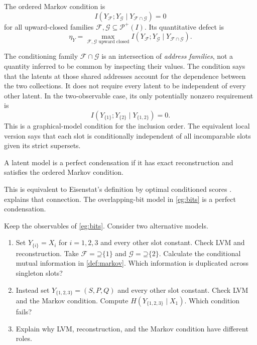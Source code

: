 \documentclass[11pt]{article}
\newcommand{\PI}{\mathcal{P}^{+}(I)}
\newcommand{\Up}{\mathord{\supseteq}}
\begin{document}
\begin{definition}
\label{def:markov}
The ordered Markov condition is
\[
 I(Y_{\mathcal{F}};Y_{\mathcal{G}}\mid
 Y_{\mathcal{F}\cap\mathcal{G}})=0
\]
for all upward-closed families $\mathcal{F},\mathcal{G}\subseteq\PI$.
Its quantitative defect is
\[
 \eta_Y=\max_{\mathcal{F},\mathcal{G}\text{ upward closed}}
 I(Y_{\mathcal{F}};Y_{\mathcal{G}}\mid Y_{\mathcal{F}\cap\mathcal{G}}).
\]
\end{definition}

The conditioning family $\mathcal{F}\cap\mathcal{G}$ is an intersection of
\emph{address families}, not a quantity inferred to be common by inspecting
their values. The condition says that the latents at those shared addresses
account for the dependence between the two collections. It does not require
every latent to be independent of every other latent. In the two-observable
case, its only potentially nonzero requirement is
\[
 I(Y_{\{1\}};Y_{\{2\}}\mid Y_{\{1,2\}})=0.
\]
This is a graphical-model condition for the inclusion order. The equivalent
local version says that each slot is conditionally independent of all
incomparable slots given its strict supersets.

\begin{definition}
\label{def:perfect}
A latent model is a perfect condensation if it has exact reconstruction
and satisfies the ordered Markov condition.
\end{definition}
This is equivalent to Eisenstat's definition by optimal conditioned scores
\citep[Theorem~5.10]{eisenstat2025condensation}.  explains that connection.
The overlapping-bit model in \cref{eg:bits} is a perfect condensation.

\begin{exercise}
\label{ex:failed}\important
Keep the observables of \cref{eg:bits}. Consider two alternative models.
\begin{enumerate}
\item Set $Y_{\{i\}}=X_i$ for $i=1,2,3$ and every other slot constant.
Check LVM and reconstruction. Take
$\mathcal{F}=\Up\{1\}$ and $\mathcal{G}=\Up\{2\}$.
Calculate the conditional mutual information in \cref{def:markov}.
Which information is duplicated across singleton slots?
\item Instead set $Y_{\{1,2,3\}}=(S,P,Q)$ and every other slot constant.
Check LVM and the Markov condition. Compute
$H(Y_{\{1,2,3\}}\mid X_1)$. Which condition fails?
\item Explain why LVM, reconstruction, and the
Markov condition have different roles.
\end{enumerate}
\end{exercise}
\end{document}
